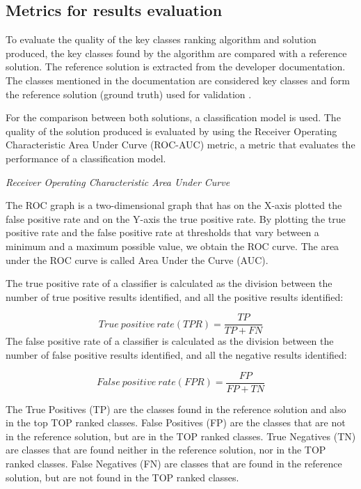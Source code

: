 \documentclass[runningheads]{comsis2}
\begin{document}
\subsection{Metrics for results evaluation}
\label{sec:evalmetrics}
To evaluate the quality of the key classes ranking algorithm and solution produced, the key classes found by the algorithm are compared with a reference solution. The reference solution is extracted from the developer documentation. The classes mentioned in the documentation are considered key classes and form the reference solution (ground truth) used for validation \cite{7551990}.

For the comparison between both solutions, a classification model is used. The quality of the solution produced is evaluated by using the Receiver Operating Characteristic Area Under Curve (ROC-AUC) metric, a metric that evaluates the performance of a classification model.


\textit{Receiver Operating Characteristic Area Under Curve}


The ROC graph is a two-dimensional graph that has on the X-axis plotted the false positive rate and on the Y-axis the true positive rate. By plotting the true positive rate and the false positive rate at thresholds that vary between a minimum and a maximum possible value, we obtain the ROC curve. The area under the ROC curve is called Area Under the Curve (AUC).

The true positive rate of a classifier is calculated as the division between the number of true positive results identified, and all the positive results identified:

\begin{equation}
 True\ positive\ rate (TPR) = \frac{TP}{TP+FN}
\end{equation}
The false positive rate of a classifier is calculated as the division between the number of false positive results identified, and all the negative results identified:

\begin{equation}
 False\ positive\ rate (FPR) = \frac{FP}{FP+TN}
\end{equation}

The True Positives (TP) are the classes found in the reference solution and also in the top TOP ranked classes. False Positives (FP) are the classes that are not in the reference solution, but are in the TOP ranked classes.
True Negatives (TN) are classes that are found neither in the reference solution, nor in the TOP ranked classes. False Negatives (FN) are classes that are found in the reference solution, but are not found in the TOP ranked classes.
\end{document}
